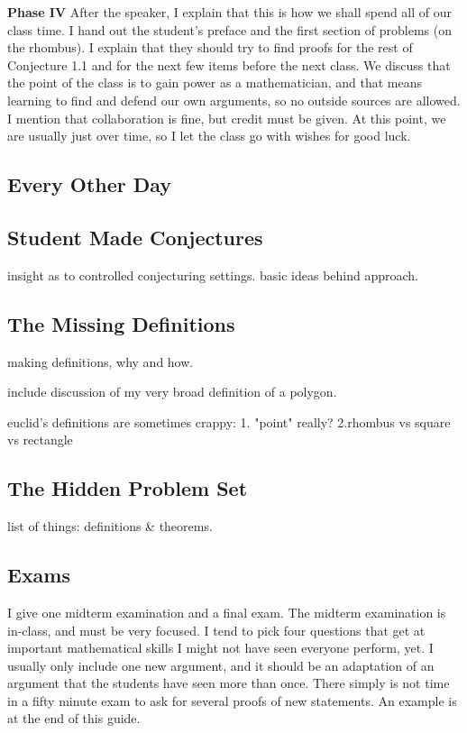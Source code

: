 \documentclass{tufte-handout}
\theoremstyle{definition}
\begin{document}
\begin{compactdesc}
\item[\textbf{Phase IV}] After the speaker, I explain that this is how we shall spend all of our class time.
I hand out the student's preface and the first section of problems (on the rhombus).
I explain that they should try to find proofs for the rest of Conjecture 1.1 and for the next few items before the next class.
We discuss that the point of the class is to gain power as a mathematician, and that means learning to find and defend our own arguments, so no outside sources are allowed.
I mention that collaboration is fine, but credit must be given.
At this point, we are usually just over time, so I let the class go with wishes for good luck.\\[.1in]
\end{compactdesc}

\subsection{Every Other Day}


\subsection{Student Made Conjectures}

insight as to controlled conjecturing settings. basic ideas behind approach.


\subsection{The Missing Definitions}

making definitions, why and how. 

include discussion of my very broad definition of a polygon.

euclid's definitions are sometimes crappy:
1. "point" really?
2.rhombus vs square vs rectangle

\subsection{The Hidden Problem Set}

list of things: definitions \& theorems.


\subsection{Exams}
I give one midterm examination and a final exam.
The midterm examination is in-class, and must be very focused.
I tend to pick four questions that get at important mathematical skills I might not have seen everyone perform, yet.
I usually only include one new argument, and it should be an adaptation of an argument that the students have seen more than once.
There simply is not time in a fifty minute exam to ask for several proofs of new statements.
An example is at the end of this guide.
\end{document}
